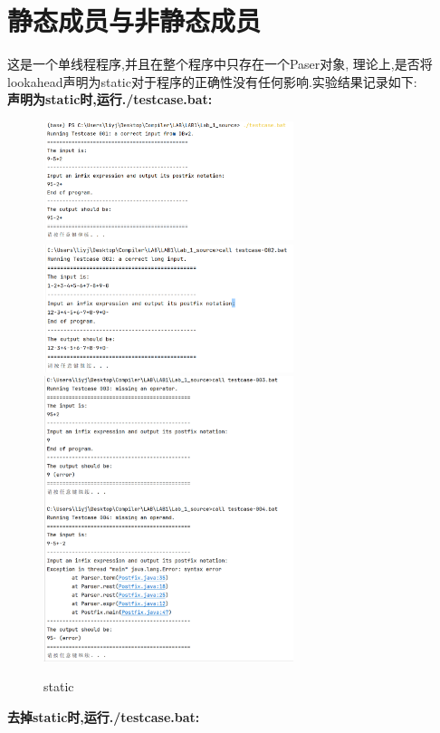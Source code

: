 \documentclass{article}
\begin{document}
\section{静态成员与非静态成员}
这是一个单线程程序,并且在整个程序中只存在一个Paser对象,
理论上,是否将lookahead声明为static对于程序的正确性没有任何影响.实验结果记录如下:\\
\textbf{声明为static时,运行./testcase.bat:}
\begin{figure}[H]
    \includegraphics[width=0.65\textwidth]{element/1.png}
    \includegraphics[width=0.65\textwidth]{element/2.png}
    \includegraphics[width=0.65\textwidth]{element/3.png}
    \caption{static}
\end{figure}
\newpage
\noindent
\textbf{去掉static时,运行./testcase.bat:}
\end{document}
